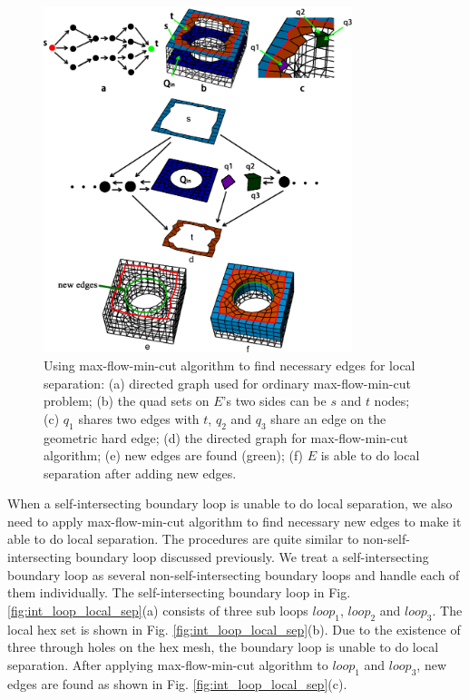 \documentclass[final,5p,times,twocolumn]{elsarticle}
\begin{document}
\begin{figure}[htbp]
\begin{center}
\includegraphics[width=9cm]{figures/max_flow_graph.png}
\caption{Using max-flow-min-cut algorithm to find necessary edges for local separation: (a) directed graph used for ordinary max-flow-min-cut problem; (b) the quad sets on $E$'s two sides can be $s$ and $t$ nodes; (c) $q_1$ shares two edges with $t$, $q_2$ and $q_3$ share an edge on the geometric hard edge; (d) the directed graph for max-flow-min-cut algorithm; (e) new edges are found (green); (f) $E$ is able to do local separation after adding new edges.}
\label{fig:max_flow_graph}
\end{center}
\end{figure}

When a self-intersecting boundary loop is unable to do local separation, we also need to apply max-flow-min-cut algorithm to find necessary new edges to make it able to do local separation. The procedures are quite similar to non-self-intersecting boundary loop discussed previously. We treat a self-intersecting boundary loop as several non-self-intersecting boundary loops and handle each of them individually. The self-intersecting boundary loop in Fig. \ref{fig:int_loop_local_sep}(a) consists of three sub loops $loop_1$, $loop_2$ and $loop_3$. The local hex set is shown in Fig. \ref{fig:int_loop_local_sep}(b). Due to the existence of three through holes on the hex mesh, the boundary loop is unable to do local separation. After applying max-flow-min-cut algorithm to $loop_1$ and $loop_3$, new edges are found as shown in Fig. \ref{fig:int_loop_local_sep}(c).
\end{document}
